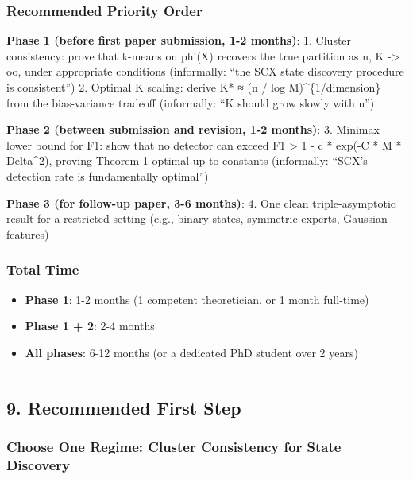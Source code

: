 \documentclass[
  12pt,
]{ctexart}
\providecommand{\tightlist}{%
  \setlength{\itemsep}{0pt}\setlength{\parskip}{0pt}}
\begin{document}
\subsubsection{Recommended Priority
Order}\label{recommended-priority-order}

\textbf{Phase 1 (before first paper submission, 1-2 months)}: 1. Cluster
consistency: prove that k-means on phi(X) recovers the true partition as
n, K -\textgreater{} oo, under appropriate conditions (informally: ``the
SCX state discovery procedure is consistent'') 2. Optimal K scaling:
derive K* ≈ (n / log M)\^{}\{1/dimension\} from the bias-variance
tradeoff (informally: ``K should grow slowly with n'')

\textbf{Phase 2 (between submission and revision, 1-2 months)}: 3.
Minimax lower bound for F1: show that no detector can exceed F1
\textgreater{} 1 - c * exp(-C * M * Delta\^{}2), proving Theorem 1
optimal up to constants (informally: ``SCX's detection rate is
fundamentally optimal'')

\textbf{Phase 3 (for follow-up paper, 3-6 months)}: 4. One clean
triple-asymptotic result for a restricted setting (e.g., binary states,
symmetric experts, Gaussian features)

\subsubsection{Total Time}\label{total-time}

\begin{itemize}
\tightlist
\item
  \textbf{Phase 1}: 1-2 months (1 competent theoretician, or 1 month
  full-time)
\item
  \textbf{Phase 1 + 2}: 2-4 months
\item
  \textbf{All phases}: 6-12 months (or a dedicated PhD student over 2
  years)
\end{itemize}

\begin{center}\rule{0.5\linewidth}{0.5pt}\end{center}

\subsection{9. Recommended First Step}\label{recommended-first-step}

\subsubsection{Choose One Regime: Cluster Consistency for State
Discovery}\label{choose-one-regime-cluster-consistency-for-state-discovery}
\end{document}
